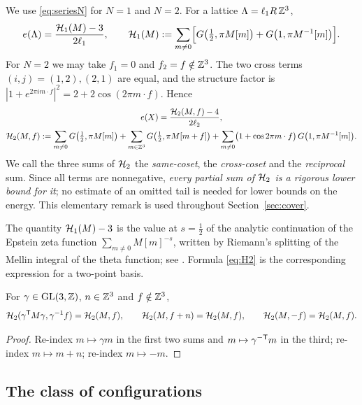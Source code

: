 We use \eqref{eq:seriesN} for $N=1$ and $N=2$. For a lattice $\Lambda=\ell_1 R\,\mathbb Z^3$,
\begin{equation}\label{eq:H1}
  e(\Lambda)=\frac{\mathcal H_1(M)-3}{2\ell_1},\qquad \mathcal H_1(M):=\sum_{m\ne0}\Bigl[G\bigl(\tfrac12,\pi M[m]\bigr)+G\bigl(1,\pi M^{-1}[m]\bigr)\Bigr].
\end{equation}
For $N=2$ we may take $f_1=0$ and $f_2=f\notin\mathbb Z^3$. The two cross terms $(i,j)=(1,2),(2,1)$ are equal, and the structure factor is
$|1+e^{2\pi im\cdot f}|^2=2+2\cos(2\pi m\cdot f)$. Hence
\begin{gather}\label{eq:H2}
  e(X)=\frac{\mathcal H_2(M,f)-4}{2\ell_2},\\
  \mathcal H_2(M,f):=\sum_{m\ne0}G\bigl(\tfrac12,\pi M[m]\bigr)+\sum_{m\in\mathbb Z^3}G\bigl(\tfrac12,\pi M[m+f]\bigr)
     +\sum_{m\ne0}\bigl(1+\cos2\pi m\cdot f\bigr)\,G\bigl(1,\pi M^{-1}[m]\bigr).\notag
\end{gather}
We call the three sums of $\mathcal H_2$ the \emph{same-coset}, the \emph{cross-coset} and the \emph{reciprocal} sum. Since all terms are
nonnegative, \emph{every partial sum of $\mathcal H_2$ is a rigorous lower bound for it}; no estimate of an omitted tail is needed for lower
bounds on the energy. This elementary remark is used throughout Section~\ref{sec:cover}.

\begin{remark}
The quantity $\mathcal H_1(M)-3$ is the value at $s=\frac12$ of the analytic continuation of the Epstein zeta function
$\sum_{m\ne0}M[m]^{-s}$, written by Riemann's splitting of the Mellin integral of the theta function; see
\cite{SarnakStrombergsson2006,MuratovNovaga2026}. Formula \eqref{eq:H2} is the corresponding expression for a two-point basis.
\end{remark}

\begin{lemma}\label{lem:Hsym}
For $\gamma\in\mathrm{GL}(3,\mathbb Z)$, $n\in\mathbb Z^3$ and $f\notin\mathbb Z^3$,
\[
  \mathcal H_2(\gamma^\mathsf T M\gamma,\gamma^{-1}f)=\mathcal H_2(M,f),\qquad \mathcal H_2(M,f+n)=\mathcal H_2(M,f),\qquad \mathcal H_2(M,-f)=\mathcal H_2(M,f).
\]
\end{lemma}

\begin{proof}
Re-index $m\mapsto\gamma m$ in the first two sums and $m\mapsto\gamma^{-\mathsf T}m$ in the third; re-index $m\mapsto m+n$; re-index $m\mapsto-m$.
\end{proof}

\subsection{The class of configurations}\label{ssec:class}

